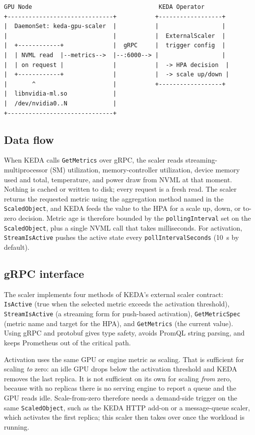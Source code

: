 \documentclass[11pt]{article}
\begin{document}
\begin{Verbatim}[fontsize=\small]
GPU Node                                    KEDA Operator
+------------------------------+           +------------------+
|  DaemonSet: keda-gpu-scaler  |           |                  |
|                              |           |  ExternalScaler  |
|  +------------+              |  gRPC     |  trigger config  |
|  | NVML read  |--metrics-->  |--:6000--> |                  |
|  | on request |              |           |  -> HPA decision  |
|  +------------+              |           |  -> scale up/down |
|       ^                      |           +------------------+
|  libnvidia-ml.so             |
|  /dev/nvidia0..N             |
+------------------------------+
\end{Verbatim}

\subsection{Data flow}
When KEDA calls \texttt{GetMetrics} over gRPC, the scaler reads
streaming-multiprocessor (SM) utilization, memory-controller utilization, device
memory used and total, temperature, and power draw from NVML at that moment.
Nothing is cached or written to disk; every request is a fresh read. The scaler
returns the requested metric using the aggregation method named in the
\texttt{ScaledObject}, and KEDA feeds the value to the HPA for a scale up, down,
or to-zero decision. Metric age is therefore bounded by the
\texttt{pollingInterval} set on the \texttt{ScaledObject}, plus a single NVML
call that takes milliseconds. For activation, \texttt{StreamIsActive} pushes
the active state every \texttt{pollIntervalSeconds} (10~s by default).

\subsection{gRPC interface}
The scaler implements four methods of KEDA's external scaler contract:
\texttt{IsActive} (true when the selected metric exceeds the activation
threshold), \texttt{StreamIsActive} (a streaming form for push-based
activation), \texttt{GetMetricSpec} (metric name and target for the HPA), and
\texttt{GetMetrics} (the current value). Using gRPC and protobuf gives type
safety, avoids PromQL string parsing, and keeps Prometheus out of the critical
path.

Activation uses the same GPU or engine metric as scaling. That is sufficient
for scaling \emph{to} zero: an idle GPU drops below the activation threshold
and KEDA removes the last replica. It is not sufficient on its own for scaling
\emph{from} zero, because with no replicas there is no serving engine to report
a queue and the GPU reads idle. Scale-from-zero therefore needs a demand-side
trigger on the same \texttt{ScaledObject}, such as the KEDA HTTP add-on or a
message-queue scaler, which activates the first replica; this scaler then takes
over once the workload is running.
\end{document}
